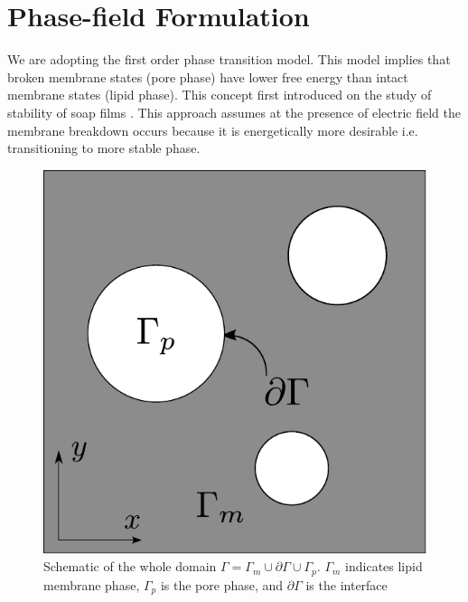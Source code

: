 \documentclass[english,12pt]{article}
\begin{document}
\section{Phase-field Formulation}
We are adopting the first order phase transition model. This model implies that broken membrane states (pore phase) have lower free energy than intact membrane states (lipid phase). This concept first introduced on the study of stability of soap films \cite{deryagin1962theory, derjaguin1981theory}. This approach assumes at the presence of electric field the membrane breakdown occurs because it is energetically more desirable i.e. transitioning to more stable phase.
\begin{figure}[H]
	\centering
	\includegraphics[scale=0.5]{pics/model1_2.pdf}
	\caption{\footnotesize{Schematic of the whole domain $\Gamma = \Gamma_m \cup \partial\Gamma \cup \Gamma_p$. $\Gamma_m$ indicates lipid membrane phase, $\Gamma_p$ is the pore phase, and $\partial\Gamma$ is the interface }}
	\label{fig:model1}
\end{figure}
\end{document}
